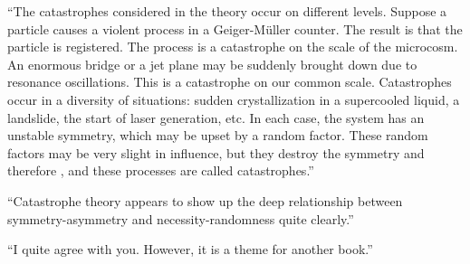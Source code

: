 \begin{dialogue}
\athr ``The catastrophes considered in the theory occur on
different levels. Suppose a particle causes a violent process in
a Geiger-M\"uller counter. The result is that the particle is registered.
The process is a catastrophe on the scale of the microcosm. An
enormous bridge or a jet plane may be suddenly brought down due to
resonance oscillations. This is a catastrophe on our common scale.
Catastrophes occur in a diversity of situations: sudden crystallization
in a supercooled liquid, a landslide, the start of laser generation, etc.
In each case, the system has an unstable symmetry, which may be
upset by a random factor. These random factors may be very slight in
influence, but they destroy the symmetry and therefore , and these processes are called
catastrophes.''

\rdr ``Catastrophe theory appears to show up the deep relationship
between symmetry-asymmetry and necessity-randomness
quite clearly.''

\athr ``I quite agree with you. However, it is a theme for another
book.''
\end{dialogue}

